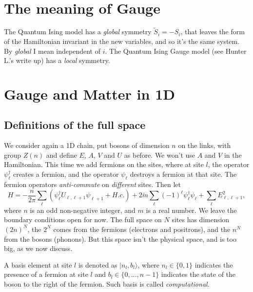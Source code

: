 
%
	
	\section{The meaning of Gauge}
	The Quantum Ising model has a \emph{global} symmetry $\tilde{S}_i = -S_i$, that leaves
	the form of the Hamiltonian invariant in the new variables, and so it's the same system.
	By \emph{global} I mean independent of $i$.
	The Quantum Ising Gauge model (see Hunter L.'s write up) has a \emph{local} symmetry.
	
	\section{Gauge and Matter in 1D}
	\subsection{Definitions of the full space}
	We consider again a 1D chain, put bosons of dimension $n$ on the links, with group $Z(n)$ and
	define $E$, $A$, $V$ and $U$ as before. We won't use $A$ and $V$ in the Hamiltonian.
	This time we add fermions on the sites, where at site $l$, the operator $\psi_\ell^\dagger$
	creates a fermion, and the operator $\psi_\ell$ destroys a fermion at that site.
	The fermion operators \emph{anti-commute} on \emph{different} sites.
	Then let
		\begin{equation}\label{eq:1dQEDLatticeHamiltonian}
	H=-\frac{n}{2\pi} \sum_\ell (\psi_\ell^\dagger U_{\ell,\ell+1}\psi_{\ell+1}+H.c.) + 2\tilde{m}\sum_\ell (-1)^\ell \psi_\ell^\dagger\psi_\ell+  \sum_{\ell} E_{\ell,\ell+1}^2,		
	\end{equation}
	where $n$ is an odd non-negative integer, and $m$ is a real number.
	We leave the boundary conditions open for now.
	The full space on $N$ sites has dimension $(2n)^{N}$, the $2^N$ comes from the fermions (electrons and positrons), 
	and the $n^N$ from the bosons (phonons). But this space isn't the physical space, and is too big, as we now discuss.
	
	A basis element at site $l$ is denoted as $|n_l, b_l\rangle$, where $n_l \in \{0,1\}$ indicates the presence of a fermion at site $l$ and $b_l \in \{0,\ldots,n-1\}$ indicates the state of the boson to the right of the fermion. Such basis is called \emph{computational}.
	
